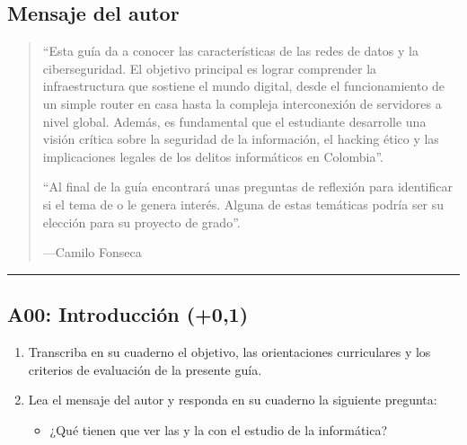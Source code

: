 \documentclass[letterpaper,10pt,spanish]{sphinxmanual}
\begin{document}
\subsection{Mensaje del autor}
\label{\detokenize{1_guias/10informatica/G1003:mensaje-del-autor}}\begin{quote}

\sphinxAtStartPar
“Esta guía da a conocer las características de las redes de datos y la ciberseguridad. El objetivo principal es lograr comprender la infraestructura que sostiene el mundo digital, desde el funcionamiento de un simple router en casa hasta la compleja interconexión de servidores a nivel global. Además, es fundamental que el estudiante desarrolle una visión crítica sobre la seguridad de la información, el hacking ético y las implicaciones legales de los delitos informáticos en Colombia”.

\sphinxAtStartPar
“Al final de la guía encontrará unas preguntas de reflexión para identificar si el tema de  o  le genera interés. Alguna de estas temáticas podría ser su elección para su proyecto de grado”.

\begin{flushright}
---Camilo Fonseca
\end{flushright}
\end{quote}


\bigskip\hrule\bigskip



\subsection{A00: Introducción (+0,1)}
\label{\detokenize{1_guias/10informatica/G1003:a00-introduccion-0-1}}
\sphinxAtStartPar
{}
\begin{enumerate}
%
\item {} 
\sphinxAtStartPar
Transcriba en su cuaderno el objetivo, las orientaciones curriculares y los criterios de evaluación de la presente guía.

\item {} 
\sphinxAtStartPar
Lea el mensaje del autor y responda en su cuaderno la siguiente pregunta:
\begin{itemize}
\item {} 
\sphinxAtStartPar
¿Qué tienen que ver las  y la  con el estudio de la informática?

\end{itemize}

\end{enumerate}
\end{document}
